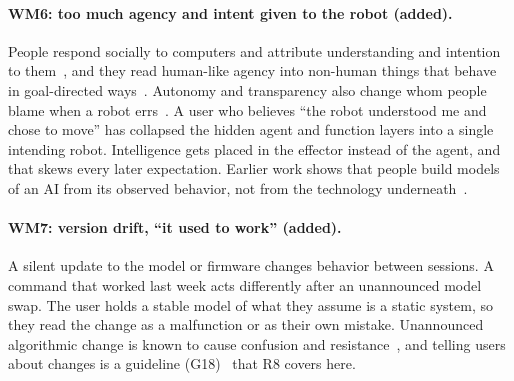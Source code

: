 \documentclass[sigconf]{acmart}
\begin{document}
\paragraph{WM6: too much agency and intent given to the robot (added).}
People respond socially to computers and attribute understanding and intention to them~\cite{nass2000machines}, and they read human-like agency into non-human things that behave in goal-directed ways~\cite{epley2007seeing}. Autonomy and transparency also change whom people blame when a robot errs~\cite{kim2006blame}. A user who believes ``the robot understood me and chose to move'' has collapsed the hidden agent and function layers into a single intending robot. Intelligence gets placed in the effector instead of the agent, and that skews every later expectation. Earlier work shows that people build models of an AI from its observed behavior, not from the technology underneath~\cite{gero2020mental}.

\paragraph{WM7: version drift, ``it used to work'' (added).}
A silent update to the model or firmware changes behavior between sessions. A command that worked last week acts differently after an unannounced model swap. The user holds a stable model of what they assume is a static system, so they read the change as a malfunction or as their own mistake. Unannounced algorithmic change is known to cause confusion and resistance~\cite{devito2017algorithms}, and telling users about changes is a guideline (G18)~\cite{amershi2019guidelines} that R8 covers here.
\end{document}
